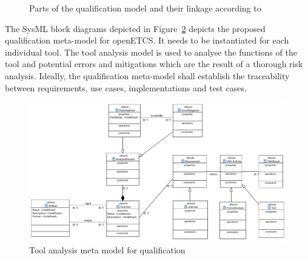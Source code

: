 \begin{figure}[htbp]
\begin{center}
\end{center}
\caption{Parts of the qualification model and their linkage according to \cite{slotosch_model-based_2012}}
\label{fig:qualification-models-linkage}
\end{figure}

The SysML block diagrams depicted in Figure~\ref{fig:tool_analysis_model} depicts the proposed qualification meta-model for openETCS. It needs to be instantiated for each individual tool. The tool analysis model is used to analyse the functions of the tool and potential errors and mitigations which are the result of a thorough risk analysis. Ideally, the qualification meta-model shall establish the traceability between requirements, use cases, implementations and test cases.


\begin{figure}
\includegraphics[width=\textwidth]{ToolAnalysisModel.pdf}
\caption{Tool analysis meta model for qualification}
\label{fig:tool_analysis_model}
\end{figure}


